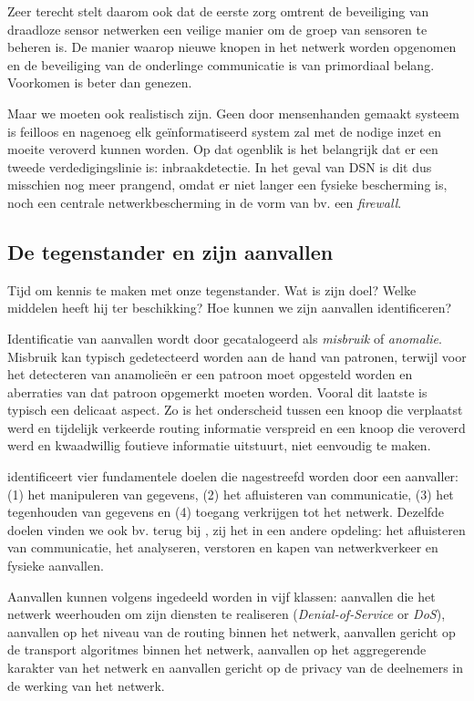 Zeer terecht stelt \cite{perrig2004security} daarom ook dat de eerste zorg
omtrent de beveiliging van draadloze sensor netwerken een veilige manier om de
groep van sensoren te beheren is. De manier waarop nieuwe knopen in het netwerk
worden opgenomen en de beveiliging van de onderlinge communicatie is van
primordiaal belang. Voorkomen is beter dan genezen.

Maar we moeten ook realistisch zijn. Geen door mensenhanden gemaakt systeem is
feilloos en nagenoeg elk ge\"informatiseerd system zal met de nodige inzet en
moeite veroverd kunnen worden. Op dat ogenblik is het belangrijk dat er een
tweede verdedigingslinie is: inbraakdetectie. In het geval van DSN is dit dus
misschien nog meer prangend, omdat er niet langer een fysieke bescherming is,
noch een centrale netwerkbescherming in de vorm van bv. een \emph{firewall}.

\subsection{De tegenstander en zijn aanvallen}

Tijd om kennis te maken met onze tegenstander. Wat is zijn doel? Welke middelen
heeft hij ter beschikking? Hoe kunnen we zijn aanvallen identificeren?

Identificatie van aanvallen wordt door \cite{zhang2000intrusion} gecatalogeerd
als \emph{misbruik} of \emph{anomalie}. Misbruik kan typisch gedetecteerd
worden aan de hand van patronen, terwijl voor het detecteren van anamolie\"en
er een patroon moet opgesteld worden en aberraties van dat patroon opgemerkt
moeten worden. Vooral dit laatste is typisch een delicaat aspect. Zo is het
onderscheid tussen een knoop die verplaatst werd en tijdelijk verkeerde routing
informatie verspreid en een knoop die veroverd werd en kwaadwillig foutieve
informatie uitstuurt, niet eenvoudig te maken.

\cite{aschenbruck2012security} identificeert vier fundamentele doelen die
nagestreefd worden door een aanvaller: (1) het manipuleren van gegevens, (2)
het afluisteren van communicatie, (3) het tegenhouden van gegevens en (4)
toegang verkrijgen tot het netwerk. Dezelfde doelen vinden we ook bv. terug bij
\cite{blilat2012wireless}, zij het in een andere opdeling: het afluisteren van
communicatie, het analyseren, verstoren en kapen van netwerkverkeer en fysieke
aanvallen.

Aanvallen kunnen volgens \cite{dargie2010fundamentals} ingedeeld worden in vijf
klassen: aanvallen die het netwerk weerhouden om zijn diensten te realiseren
(\emph{Denial-of-Service} or \emph{DoS}), aanvallen op het niveau van de
routing binnen het netwerk, aanvallen gericht op de transport algoritmes binnen
het netwerk, aanvallen op het aggregerende karakter van het netwerk en
aanvallen gericht op de privacy van de deelnemers in de werking van het netwerk.

